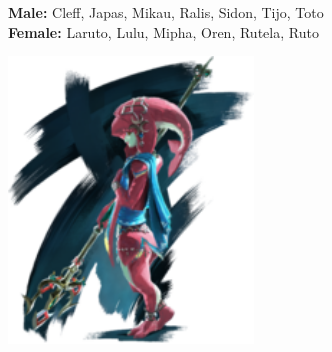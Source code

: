 \documentclass[10pt,twoside,twocolumn,openany]{book}
\begin{document}
\textbf{Male:} Cleff, Japas, Mikau, Ralis, Sidon, Tijo, Toto \\
\textbf{Female:} Laruto, Lulu, Mipha, Oren, Rutela, Ruto 

\includegraphics[width=65mm,scale=0.5]{mipha.png} \\
\end{document}
